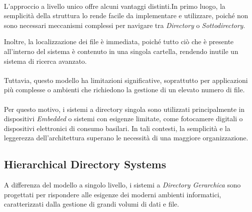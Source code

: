 \documentclass[12pt,a4paper,openright,twoside]{book}
\begin{document}
            \paragraph*{}

            L'approccio a livello unico offre alcuni vantaggi distinti.In primo luogo, la semplicità della struttura lo rende facile da implementare e utilizzare, poiché non sono necessari meccanismi complessi per navigare tra \textit{Directory} o \textit{Sottodirectory}.

            Inoltre, la localizzazione dei file è immediata, poiché tutto ciò che è presente all'interno del sistema è contenuto in una singola cartella, rendendo inutile un sistema di ricerca avanzato.

            \paragraph*{}

            Tuttavia, questo modello ha limitazioni significative, soprattutto per applicazioni più complesse o ambienti che richiedono la gestione di un elevato numero di file.

            \paragraph*{}

            Per questo motivo, i sistemi a directory singola sono utilizzati principalmente in dispositivi \textit{Embedded} o sistemi con esigenze limitate, come fotocamere digitali o dispositivi elettronici di consumo basilari. In tali contesti, la semplicità e la leggerezza dell'architettura superano le necessità di una maggiore organizzazione.

        \subsection{Hierarchical Directory Systems}

            A differenza del modello a singolo livello, i sistemi a \textit{Directory Gerarchica} sono progettati per rispondere alle esigenze dei moderni ambienti informatici, caratterizzati dalla gestione di grandi volumi di dati e file.

            \paragraph*{}
            
\end{document}
